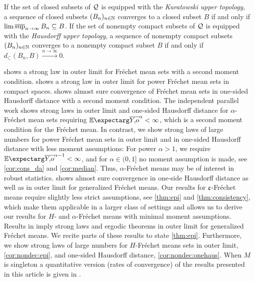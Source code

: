 If the set of closed subsets of $\mathcal{Q}$ is equipped with the \textit{Kuratowski upper topology}, a sequence of closed subsets $(B_n)_{n\in\mathbb{N}}$ converges to a closed subset $B$ if and only if $\operatorname*{lim\, \overline{sup}}_{n\to\infty} B_n \subseteq B$. 
If the set of nonempty compact subsets of $\mathcal{Q}$ is equipped with the \textit{Hausdorff upper topology}, a sequence of nonempty compact subsets $(B_n)_{n\in\mathbb{N}}$ converges to a nonempty compact subset $B$ if and only if $d_{\subset}(B_n, B)\xrightarrow{n\to\infty} 0$. 

\cite{ziezold77} shows a strong law in outer limit for Fréchet mean sets with a second moment condition.
\cite{sverdrup81} shows a strong law in outer limit for power Fréchet mean sets in compact spaces.
\cite{bhattacharya03} shows almost sure convergence of Fréchet mean sets in one-sided Hausdorff distance with a second moment condition.
The independent parallel work \cite{evans20} shows strong laws in outer limit and one-sided Hausdorff distance for $\alpha$-Fréchet mean sets requiring $\Ex{\ol Yo^{\alpha}} < \infty$, which is a second moment condition for the Fréchet mean.
In contrast, we show strong laws of large numbers for power Fréchet mean sets in outer limit and in one-sided Hausdorff distance with less moment assumptions: For power $\alpha>1$, we require $\Ex{\ol Yo^{\alpha-1}} < \infty$, and for $\alpha\in (0,1]$ no moment assumption is made, see \autoref{cor:cons_da} and \autoref{cor:median}. Thus, $\alpha$-Fréchet means may be of interest in robust statistics.
\cite{huckemann11} shows almost sure convergence in one-side Hausdorff distance as well as in outer limit for generalized Fréchet means. Our results for $\mathfrak{c}$-Fréchet means require slightly less strict assumptions, see \autoref{thm:epi} and \autoref{thm:consistency}, which make them applicable in a larger class of settings and allows us to derive our results for $H$- and $\alpha$-Fréchet means with minimal moment assumptions.
Results in \cite{artstein95, korf01, choirat03} imply strong laws and ergodic theorems in outer limit for generalized Fréchet means. We recite parts of these results to state \autoref{thm:epi}.
Furthermore, we show strong laws of large numbers for $H$-Fréchet means sets in outer limit, \autoref{cor:nondec:epi}, and one-sided Hausdorff distance, \autoref{cor:nondec:onehaus}.
When $M$ is singleton a quantitative version (rates of convergence) of the results presented in this article is given in \cite{schoetz19}.

